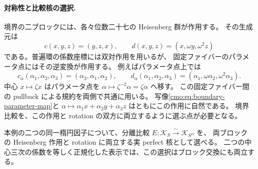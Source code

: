 \paragraph{対称性と比較核の選択.}
境界の二ブロックには、各々位数二十七の Heisenberg 群が作用する。
その生成元は
\[
 c(x,y,z)=(y,z,x),\qquad d(x,y,z)=(x,\omega y,\omega^2z)
\]
である。普遍環の係数座標には双対作用を用いるが、
固定ファイバーのパラメータ点にはその逆変換が作用する。
例えばパラメータ点上では
\[
 c_\alpha(\alpha_1,\alpha_2,\alpha_3)
       =(\alpha_3,\alpha_1,\alpha_2),\qquad
 d_\alpha(\alpha_1,\alpha_2,\alpha_3)
       =(\alpha_1,\omega\alpha_2,\omega^2\alpha_3).
\]
中心 $x\mapsto\zeta x$ はパラメータ点を
$\alpha\mapsto\zeta^{-2}\alpha=\zeta\alpha$ へ移す。
この固定ファイバー間の pullback による規約を両側で共通に用いる。
写像\eqref{cmo:eq:boundary-parameter-map}と
$\alpha\mapsto\alpha_1x+\alpha_2y+\alpha_3z$ はともにこの作用に自然である。
境界比較を、この作用と rotation の双方に両立するように選ぶ点が必要となる。

\begin{lemma}
\label{cmo:lem:heisenberg-boundary-comparison}
本例の二つの同一楕円因子について、分離比較
$E:\mathcal K_S\xrightarrow{\sim}\mathcal K_{S^{\mathrm{cl}}}$ を、
両ブロックの Heisenberg 作用と rotation に両立する実 perfect 核として選べる。
二つの中心三次の係数を等しく正規化した表示では、この選択はブロック交換にも両立する。
\end{lemma}

